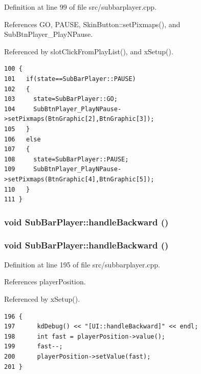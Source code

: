 Definition at line 99 of file src/subbarplayer.cpp.

References GO, PAUSE, Skin\-Button::set\-Pixmaps(), and Sub\-Btn\-Player\_\-Play\-NPause.

Referenced by slot\-Click\-From\-Play\-List(), and x\-Setup().



\footnotesize\begin{verbatim}100 {
101   if(state==SubBarPlayer::PAUSE)
102   {
103     state=SubBarPlayer::GO;
104     SubBtnPlayer_PlayNPause->setPixmaps(BtnGraphic[2],BtnGraphic[3]);
105   }
106   else
107   {
108     state=SubBarPlayer::PAUSE;
109     SubBtnPlayer_PlayNPause->setPixmaps(BtnGraphic[4],BtnGraphic[5]);
110   }
111 }
\end{verbatim}\normalsize 
{}
\subsubsection{\setlength{\rightskip}{0pt plus 5cm}void Sub\-Bar\-Player::handle\-Backward ()\hspace{0.3cm}{\tt  [slot]}}\label{classSubBarPlayer_SubBarPlayeri27}


\subsubsection{\setlength{\rightskip}{0pt plus 5cm}void Sub\-Bar\-Player::handle\-Backward ()\hspace{0.3cm}{\tt  [slot]}}\label{classSubBarPlayer_SubBarPlayeri9}




Definition at line 195 of file src/subbarplayer.cpp.

References player\-Position.

Referenced by x\-Setup().



\footnotesize\begin{verbatim}196 {
197      kdDebug() << "[UI::handleBackward]" << endl;
198      int fast = playerPosition->value();
199      fast--;
200      playerPosition->setValue(fast);
201 }
\end{verbatim}\normalsize 
{}

